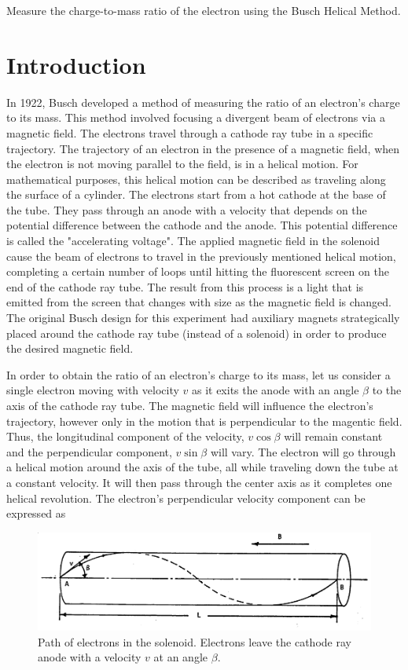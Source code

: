\documentclass[%
 aip,
 amsmath,amssymb,
 reprint,%
floatfix,
]{revtex4-1}
\begin{document}
	Measure the charge-to-mass ratio of the electron using the Busch Helical Method.

\section{\label{sec:level2}Introduction}

In 1922, Busch developed a method of measuring the ratio of an electron's charge to its mass. This method involved focusing a divergent beam of electrons via a magnetic field. The electrons travel through a cathode ray tube in a specific trajectory. The trajectory of an electron in the presence of a magnetic field, when the electron is not moving parallel to the field, is in a helical motion. For mathematical purposes, this helical motion can be described as traveling along the surface of a cylinder. The electrons start from a hot cathode at the base of the tube. They pass through an anode with a velocity that depends on the potential difference between the cathode and the anode. This potential difference is called the "accelerating voltage". The applied magnetic field in the solenoid cause the beam of electrons to travel in the previously mentioned helical motion, completing a certain number of loops until hitting the fluorescent screen on the end of the cathode ray tube. The result from this process is a light that is emitted from the screen that changes with size as the magnetic field is changed. The original Busch design for this experiment had auxiliary magnets strategically placed around the cathode ray tube (instead of a solenoid) in order to produce the desired magnetic field\cite{Stranathan1942}.

In order to obtain the ratio of an electron's charge to its mass, let us consider a single electron moving with velocity $v$ as it exits the anode with an angle $\beta$ to the axis of the cathode ray tube. The magnetic field will influence the electron's trajectory, however only in the motion that is perpendicular to the magentic field. Thus, the longitudinal component of the velocity, $v \cos{\beta}$ will remain constant and the perpendicular component, $v \sin{\beta}$ will vary. The electron will go through a helical motion around the axis of the tube, all while traveling down the tube at a constant velocity. It will then pass through the center axis as it completes one helical revolution. The electron's perpendicular velocity component can be expressed as

\begin{figure}[H]
		\centering
		\includegraphics[scale=0.5]{electrontrajectory.png}
		\caption{Path of electrons in the solenoid. Electrons leave the cathode ray anode with a velocity $v$ at an angle $\beta$.}
	\end{figure}
\end{document}
